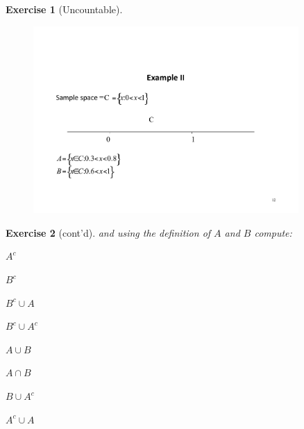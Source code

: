 \documentclass[notes=show]{beamer}\usepackage[]{graphicx}\usepackage[]{color}
\newtheorem{exercise}{Exercise}[section]
\begin{document}
\begin{frame}{\secname}
  \begin{exercise} [Uncountable]
  \begin{figure}[h!]
  \centering
  \includegraphics[width=0.9\textwidth,height=0.6\textheight]{img/Example3.pdf}
  \end{figure}
  \end{exercise}
\end{frame}


\begin{frame}{\secname}
  \begin{exercise}[cont'd]
  and using the definition of $A$ and $B$ compute:
  \begin{itemize}
  \begin{multicols}{2}
  \item $A^c$
  \item $B^c$
  \item $B^c \cup A$
  \item $B^c \cup A^c$
  \item $A \cup B$
  \item $A \cap B$
  \item $B \cup A^c$
  \item $A^c \cup A $
  \end{multicols}
\end{itemize}

\end{exercise}
\end{frame}
\end{document}
